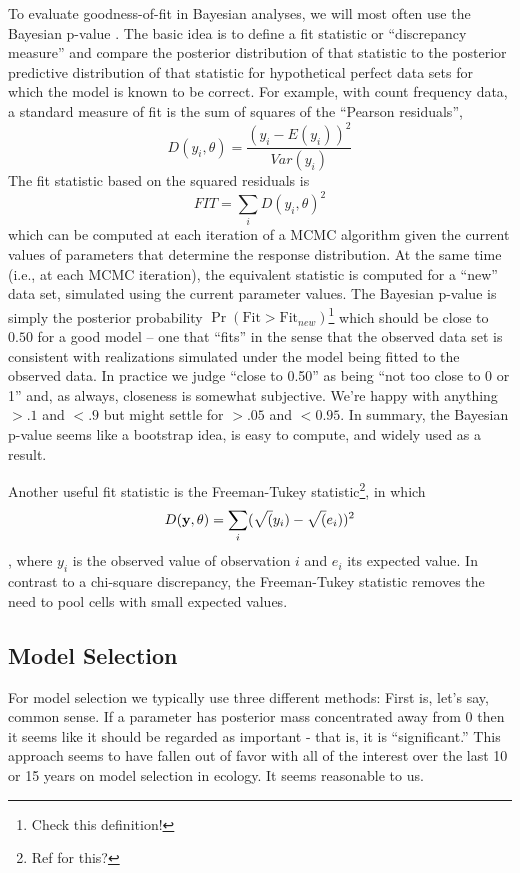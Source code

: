 To evaluate goodness-of-fit in Bayesian analyses, we will most often
use the Bayesian p-value \citep{gelman_etal:1996}.  The basic idea is to define
a fit statistic or ``discrepancy measure'' and compare the posterior distribution of that
statistic to the posterior predictive distribution of that statistic
for hypothetical perfect data sets for which the model is known to be correct. For
example, with count frequency data, a standard measure of fit is the
sum of squares of the ``Pearson residuals'',
\[
D(y_i,\theta) = \frac{(y_i - E(y_i))^{2}}{Var( y_{i} )}
\]
The fit statistic based on the squared residuals is
\[
FIT = \sum_{i} D(y_{i},\theta)^{2}
\]
which can be computed at each iteration of a MCMC algorithm given the
current values of parameters that determine the
 response distribution.  At the same time (i.e., at each MCMC
 iteration),
the equivalent statistic is computed for a
``new'' data set, simulated using the current parameter values. The
Bayesian p-value is simply the posterior probability $\Pr(\mbox{Fit} >
\mbox{Fit}_{new})$\footnote{Check this definition!}
 which should be close to $0.50$ for a good model -- one that
 ``fits'' in the sense that the observed data set is
 consistent with realizations simulated under the model being fitted
 to the observed data. In practice
we judge ``close to 0.50'' as being ``not too close to 0 or 1'' and,
as always, closeness is somewhat subjective. We're happy with anything
$>.1$ and $<.9$ but might settle for $>.05$ and $<0.95$. In summary,
the Bayesian p-value seems like a bootstrap idea, is easy to compute,
and widely used as a result.

Another useful fit statistic is the Freeman-Tukey
statistic\footnote{Ref for this?}, in which
\[
D({\bf y},\theta) = \sum_{i} ( \sqrt(y_{i}) - \sqrt(e_{i}) )^2
\]
\citep{brooks_etal:2000}, where $y_{i}$ is the observed value of
observation $i$ and $e_{i}$ its expected value. In contrast to a
chi-square discrepancy, the Freeman-Tukey statistic removes the need
to pool cells with small expected values.


\subsection{Model Selection }

For model selection we typically use three different methods: First
is, let's say, common sense. If a parameter has posterior mass
concentrated away from 0 then it seems like it should be regarded as
important - that is, it is ``significant.''  This approach seems to
have fallen out of favor with all of the interest over the last 10 or
15 years on model selection in ecology. It seems reasonable to us.


